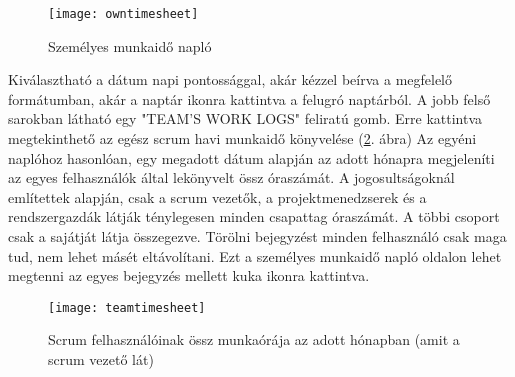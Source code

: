 \begin{figure}[H]
	\centering
	\texttt{[image: owntimesheet]}
	\caption{Személyes munkaidő napló}
	\label{fig:personaltimesheet}
\end{figure}

Kiválasztható a dátum napi pontossággal, akár kézzel beírva a megfelelő formátumban, akár a naptár ikonra kattintva a felugró naptárból. A jobb felső sarokban látható egy "TEAM'S WORK LOGS" feliratú gomb. Erre kattintva megtekinthető az egész scrum havi munkaidő könyvelése (\ref{fig:teamtimesheet}. ábra) Az egyéni naplóhoz hasonlóan, egy megadott dátum alapján az adott hónapra megjeleníti az egyes felhasználók által lekönyvelt össz óraszámát. A jogosultságoknál említettek alapján, csak a scrum vezetők, a projektmenedzserek és a rendszergazdák látják ténylegesen minden csapattag óraszámát. A többi csoport csak a sajátját látja összegezve. Törölni bejegyzést minden felhasználó csak maga tud, nem lehet másét eltávolítani. Ezt a személyes munkaidő napló oldalon lehet megtenni az egyes bejegyzés mellett kuka ikonra kattintva.

\begin{figure}[H]
	\centering
	\texttt{[image: teamtimesheet]}
	\caption{Scrum felhasználóinak össz munkaórája az adott hónapban (amit a scrum vezető lát)}
	\label{fig:teamtimesheet}
\end{figure}

\newpage
